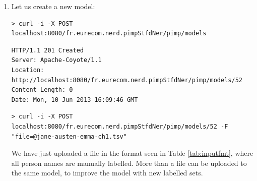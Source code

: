 \documentclass[a4paper,11pt]{report}
\newcommand{\shell}{\noindent\texttt}
\begin{document}
\begin{enumerate}
\begin{lstlisting}
> curl -i -X POST localhost:8080/fr.eurecom.nerd.pimpStfdNer/pimp/annotations -d "docId=213"
\end{lstlisting}

Again, we follow the location of the new resource created and get to the following:


\begin{lstlisting}
> curl -i -X GET -H "Accept:application/json" localhost:8080/fr.eurecom.nerd.pimpStfdNer/pimp/annotations/278
\end{lstlisting}


\begin{lstlisting}
HTTP/1.1 200 OK
Server: Apache-Coyote/1.1
Content-Type: application/json
Transfer-Encoding: chunked
Date: Mon, 10 Jun 2013 15:24:33 GMT
\end{lstlisting}
\begin{lstlisting}[language=json]
{"token":[{"label":"O","word":"Emma"},{"label":"O","word":"and"},{"label":"PERSON","word":"Elizabeth"},{"label":"O","word":"shared"},{"label":"O","word":"a"},{"label":"O","word":"dream"},{"label":"O","word":"."}]}
\end{lstlisting}

We see that the default model does not correctly label "Emma", while Elizabeth is correctly tagged as \texttt{PERSON}.

\item Let us create a new model:

\begin{lstlisting}
> curl -i -X POST localhost:8080/fr.eurecom.nerd.pimpStfdNer/pimp/models
\end{lstlisting}

\begin{lstlisting}
HTTP/1.1 201 Created
Server: Apache-Coyote/1.1
Location: http://localhost:8080/fr.eurecom.nerd.pimpStfdNer/pimp/models/52
Content-Length: 0
Date: Mon, 10 Jun 2013 16:09:46 GMT
\end{lstlisting}

\begin{lstlisting}
> curl -i -X POST localhost:8080/fr.eurecom.nerd.pimpStfdNer/pimp/models/52 -F "file=@jane-austen-emma-ch1.tsv"
\end{lstlisting}

We have just uploaded a file in the format seen in Table \ref{tab:inputfmt}, where all person names are manually labelled. More than a file can be uploaded to the same model, to improve the model with new labelled sets.


\end{enumerate}
\end{document}
